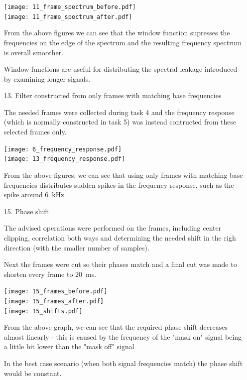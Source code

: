 \documentclass[a4paper, 11pt]{article}
\begin{document}
\begin{enumerate}
        \texttt{[image: 11\_frame\_spectrum\_before.pdf]} \\
        \texttt{[image: 11\_frame\_spectrum\_after.pdf]}

        From the above figures we can see that the window function
        supresses the frequencies on the edge of the spectrum and the resulting frequency spectrum is overall smoother.

        Window functions are useful for distributing the spectral leakage introduced by examining longer signals.

        \vspace{6mm}
        \item[13.]
        Filter constructed from only frames with matching base frequencies

        The needed frames were collected during task 4 and the frequency response
        (which is normally constructed in task 5) was instead contructed from these selected frames only.

        \texttt{[image: 6\_frequency\_response.pdf]} \\
        \texttt{[image: 13\_frequency\_response.pdf]}

        From the above figures, we can see that using only frames with matching base frequencies distributes
        sudden spikes in the frequency response, such as the spike around 6~kHz.

        \newpage
        \item[15.]
        Phase shift

        The advised operations were performed on the frames, including center clipping,
        correlation both ways and determining the needed shift
        in the righ direction (with the smaller number of samples).

        Next the frames were cut so their phases match and a final cut was made to shorten every frame to 20~ms.

        \texttt{[image: 15\_frames\_before.pdf]} \\
        \texttt{[image: 15\_frames\_after.pdf]} \\
        \texttt{[image: 15\_shifts.pdf]}

        From the above graph, we can see that the required phase shift decreases almost linearly -
        this is caused by the frequency of the "mask on" signal being a little bit lower than the "mask off" signal

        In the best case scenario (when both signal frequencies match) the phase shift would be constant.


\end{enumerate}
\end{document}
